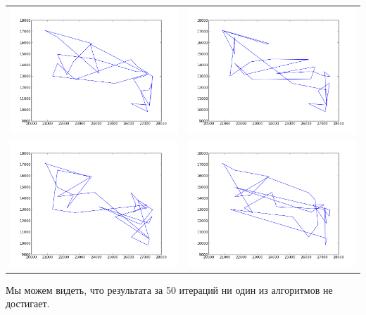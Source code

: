 \documentclass[a4paper]{article}
\begin{document}
\begin{tabular}{cc}
\includegraphics[width=7cm]{5.png} & \includegraphics[width=7cm]{6.png} \\
\includegraphics[width=7cm]{7.png} & \includegraphics[width=7cm]{8.png}
\end{tabular}

Мы можем видеть, что результата за 50 итераций ни один из алгоритмов не достигает.

\newpage
\end{document}
